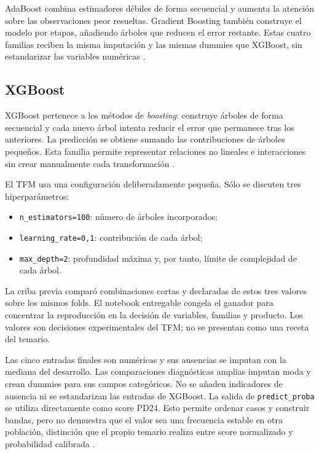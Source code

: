 \documentclass[10pt,a4paper]{article}
\newcommand{\XGBTrees}{100}
\newcommand{\XGBRate}{0,1}
\newcommand{\XGBDepth}{2}
\begin{document}
AdaBoost combina estimadores débiles de forma secuencial y aumenta la atención
sobre las observaciones peor resueltas. Gradient Boosting también construye el
modelo por etapas, añadiendo árboles que reducen el error restante. Estas cuatro
familias reciben la misma imputación y las mismas dummies que XGBoost, sin
estandarizar las variables numéricas
\cite[p.~71]{spark}\cite[p.~24]{ml-semanas}.

\subsection{XGBoost}

XGBoost pertenece a los métodos de \emph{boosting}: construye árboles de forma
secuencial y cada nuevo árbol intenta reducir el error que permanece tras los
anteriores. La predicción se obtiene sumando las contribuciones de árboles
pequeños. Esta familia permite representar relaciones no lineales e
interacciones sin crear manualmente cada transformación
\cite{clasificadores}\cite[p.~24]{ml-semanas}.

El TFM usa una configuración deliberadamente pequeña. Sólo se discuten tres
hiperparámetros:

\begin{itemize}
\item \texttt{n\_estimators=\XGBTrees}: número de árboles incorporados;
\item \texttt{learning\_rate=\XGBRate}: contribución de cada árbol;
\item \texttt{max\_depth=\XGBDepth}: profundidad máxima y, por tanto, límite
de complejidad de cada árbol.
\end{itemize}

La criba previa comparó combinaciones cortas y declaradas de estos tres valores
sobre los mismos folds. El notebook entregable congela el ganador para concentrar
la reproducción en la decisión de variables, familias y producto. Los valores son
decisiones experimentales del TFM; no se presentan como una receta del temario.

Las cinco entradas finales son numéricas y sus ausencias se imputan con la
mediana del desarrollo. Las comparaciones diagnósticas amplias imputan moda y
crean dummies para sus campos categóricos. No se añaden indicadores de ausencia
ni se estandarizan las entradas de XGBoost. La salida de
\texttt{predict\_proba} se utiliza directamente como score PD24. Esto permite
ordenar casos y construir bandas, pero no demuestra que el valor sea una
frecuencia estable en otra población, distinción que el propio temario realiza
entre score normalizado y probabilidad calibrada \cite[p.~78]{spark}.
\end{document}
